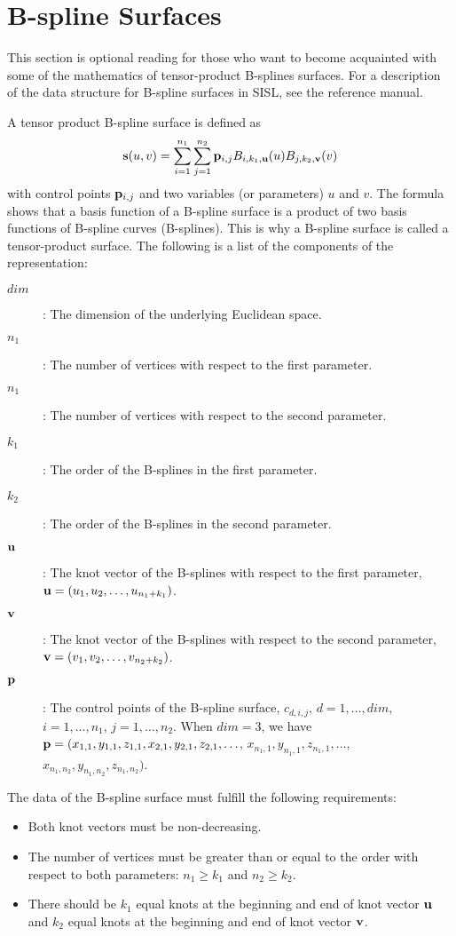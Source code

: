 \section{B-spline Surfaces}

This section is optional reading for those who want to
become acquainted with some of the mathematics of
tensor-product B-splines surfaces. For a description of the data structure for
B-spline surfaces in SISL, see the reference manual.

A tensor product B-spline surface is defined as
\[{\bf s}(u,v) = \sum_{i=1}^{n_1}\sum_{j=1}^{n_2}{\bf p}_{i,j} 
	B_{i,k_1,{\bf u}}(u) B_{j,k_2,{\bf v}}(v) \]
with control points ${\bf p}_{i,j}$ and two variables
(or parameters) $u$ and $v$.
The formula shows that a basis function of a B-spline surface is a
product of two basis functions of B-spline curves (B-splines).
This is why a B-spline surface is called a tensor-product surface.
The following is a list of the components of the representation:
\begin{description}
\item[$dim$]: The dimension of the underlying Euclidean space.
\item[$n_1$]: The number of vertices with respect to the first parameter.
\item[$n_1$]: The number of vertices with respect to the second parameter.
\item[$k_1$]: The order of the B-splines in the first parameter.
\item[$k_2$]: The order of the B-splines in the second parameter.
\item[${\bf u}$]: The knot vector of the B-splines with respect to
                  the first parameter,
                  ${\bf u} = (u_1,u_2,\ldots,u_{n_1+k_1})$.
\item[${\bf v}$]: The knot vector of the B-splines with respect to
                  the second parameter,
                  ${\bf v} = (v_1,v_2,\ldots,v_{n_2+k_2})$.
\item[${\bf p}$]: The control points of the B-spline surface,
           $c_{d,i,j}$, $d=1,\ldots,dim$, $i=1,\ldots,n_1$,
		$j=1,\ldots,n_2$.
	When $dim = 3$, we have
          ${\bf p} = (x_{1,1},y_{1,1},z_{1,1},x_{2,1},y_{2,1},z_{2,1},\ldots$,
                  $x_{n_1,1},y_{n_1,1},z_{n_1,1},\ldots$,
                     $x_{n_1,n_2},y_{n_1,n_2},z_{n_1,n_2})$.
\end{description}

The data of the B-spline surface must fulfill the following requirements:
\begin{itemize}
\item
Both knot vectors must be non-decreasing.
\item
The number of vertices must be greater than or equal to the order
with respect to both parameters: $n_1 \ge k_1$ and $n_2 \ge k_2$.
\item
There should be $k_1$ equal knots at the beginning and end 
of knot vector ${\bf u}$ and $k_2$ equal knots at the beginning and
end of knot vector ${\bf v}$.
\end{itemize}

